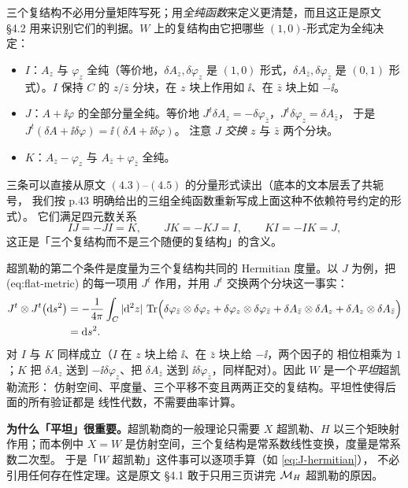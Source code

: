 三个复结构不必用分量矩阵写死；用\emph{全纯函数}来定义更清楚，而且这正是原文
§4.2 用来识别它们的判据。$W$ 上的复结构由它把哪些 $(1,0)$-形式定为全纯决定：\pA{}
\begin{itemize}
\item $I$：$A_z$ 与 $\varphi_z$ 全纯（等价地，$\delta A_z,\delta\varphi_z$ 是 $(1,0)$
  形式，$\delta A_{\bar z},\delta\varphi_{\bar z}$ 是 $(0,1)$ 形式）。$I$ 保持 $C$ 的
  $z/\bar z$ 分块，在 $z$ 块上作用如 $\ii$、在 $\bar z$ 块上如 $-\ii$。
\item $J$：$A+\ii\varphi$ 的全部分量全纯。等价地
  \(J^t\delta A_z=-\delta\varphi_{\bar z}\)，\(J^t\delta\varphi_z=\delta A_{\bar z}\)，
  于是 \(J^t(\delta A+\ii\delta\varphi)=\ii(\delta A+\ii\delta\varphi)\)。
  注意 $J$ \emph{交换} $z$ 与 $\bar z$ 两个分块。
\item $K$：$A_z-\varphi_z$ 与 $A_{\bar z}+\varphi_{\bar z}$ 全纯。
\end{itemize}
三条可以直接从原文 $(4.3)$--$(4.5)$ 的分量形式读出（底本的文本层丢了共轭号，
我们按 p.43 明确给出的三组全纯函数重新写成上面这种不依赖符号约定的形式）。
它们满足四元数关系
\begin{equation}
IJ=-JI=K,\qquad JK=-KJ=I,\qquad KI=-IK=J ,
\label{eq:quat}
\end{equation}
这正是「三个复结构而不是三个随便的复结构」的含义。\pA{}

超凯勒的第二个条件是度量为三个复结构共同的 Hermitian 度量。以 $J$ 为例，把
(eq:flat-metric) 的每一项用 $J^t$ 作用，并用 $J^t$ 交换两个分块这一事实：
\begin{align}
J^t\otimes J^t\bigl(\mathrm{d} s^2\bigr)
&=-\frac{1}{4\pi}\int_C|\mathrm{d}^2z|\,\operatorname{Tr}\Bigl(
\delta\varphi_{\bar z}\otimes\delta\varphi_z+\delta\varphi_z\otimes\delta\varphi_{\bar z}
+\delta A_{\bar z}\otimes\delta A_z+\delta A_z\otimes\delta A_{\bar z}\Bigr)\notag\\
&=\mathrm{d} s^2 .
\label{eq:J-hermitian}
\end{align}
对 $I$ 与 $K$ 同样成立（$I$ 在 $z$ 块上给 $\ii$、在 $\bar z$ 块上给 $-\ii$，两个因子的
相位相乘为 $1$；$K$ 把 $\delta A_z$ 送到 $-\ii\delta\varphi_z$、把 $\delta A_{\bar z}$
送到 $\ii\delta\varphi_{\bar z}$，同样配对）。因此 $W$ 是一个\emph{平坦}超凯勒流形：
仿射空间、平度量、三个平移不变且两两正交的复结构。平坦性使得后面的所有验证都是
线性代数，不需要曲率计算。\pA{}

\begin{keyidea}
\textbf{为什么「平坦」很重要。}超凯勒商的一般理论只需要 $X$ 超凯勒、$H$ 以三个矩映射
作用；而本例中 $X=W$ 是仿射空间，三个复结构是常系数线性变换，度量是常系数二次型。
于是「$W$ 超凯勒」这件事可以逐项手算（如 \eqref{eq:J-hermitian}），
不必引用任何存在性定理。这是原文 §4.1 敢于只用三页讲完 $\mathcal{M}_H$ 超凯勒的原因。
\end{keyidea}

